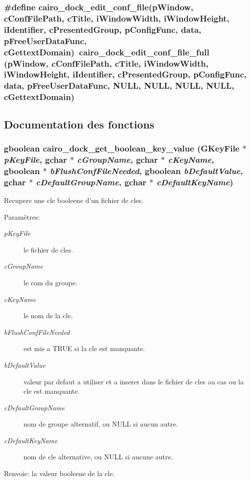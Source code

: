 \subsubsection{\setlength{\rightskip}{0pt plus 5cm}\#define cairo\_\-dock\_\-edit\_\-conf\_\-file(pWindow, cConfFilePath, cTitle, iWindowWidth, iWindowHeight, iIdentifier, cPresentedGroup, pConfigFunc, data, pFreeUserDataFunc, cGettextDomain)~cairo\_\-dock\_\-edit\_\-conf\_\-file\_\-full (pWindow, cConfFilePath, cTitle, iWindowWidth, iWindowHeight, iIdentifier, cPresentedGroup, pConfigFunc, data, pFreeUserDataFunc, NULL, NULL, NULL, NULL, cGettextDomain)}\label{cairo-dock-config_8h_a9839c43a080311d048fc2f5f9e2b11e}




\subsection{Documentation des fonctions}
\subsubsection{\setlength{\rightskip}{0pt plus 5cm}gboolean cairo\_\-dock\_\-get\_\-boolean\_\-key\_\-value (GKeyFile $\ast$ {\em pKeyFile}, gchar $\ast$ {\em cGroupName}, gchar $\ast$ {\em cKeyName}, gboolean $\ast$ {\em bFlushConfFileNeeded}, gboolean {\em bDefaultValue}, gchar $\ast$ {\em cDefaultGroupName}, gchar $\ast$ {\em cDefaultKeyName})}\label{cairo-dock-config_8h_7f221b2e5161810f62738ed51a2a732e}


Recupere une cle booleene d'un fichier de cles. \begin{Desc}
\item[Paramètres:]
\begin{description}
\item[{\em pKeyFile}]le fichier de cles. \item[{\em cGroupName}]le com du groupe. \item[{\em cKeyName}]le nom de la cle. \item[{\em bFlushConfFileNeeded}]est mis a TRUE si la cle est manquante. \item[{\em bDefaultValue}]valeur par defaut a utiliser et a inserer dans le fichier de cles au cas ou la cle est manquante. \item[{\em cDefaultGroupName}]nom de groupe alternatif, ou NULL si aucun autre. \item[{\em cDefaultKeyName}]nom de cle alternative, ou NULL si aucune autre. \end{description}
\end{Desc}
\begin{Desc}
\item[Renvoie:]la valeur booleene de la cle. \end{Desc}
